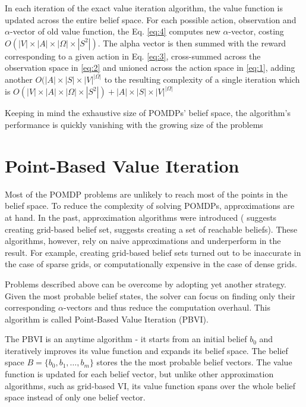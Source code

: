 In each iteration of the exact value iteration algorithm, the value function is updated across the entire belief space. For each possible action, observation and $\alpha$-vector of old value function, the Eq. \ref{eq:4} computes new $\alpha$-vector, costing $O(|V| \times |A| \times |\Omega| \times |S^2|)$. The alpha vector is then summed with the reward corresponding to a given action in Eq. \ref{eq:3}, cross-summed across the observation space in \ref{eq:2} and unioned across the action space in \ref{eq:1}, adding another $O(|A| \times |S| \times |V|^{|\Omega|}$ to the resulting complexity of a single iteration which is $O(|V| \times |A| \times |\Omega| \times |S^2|) + |A| \times |S| \times |V|^{|\Omega|}$ 

 Keeping in mind the exhaustive size of POMDPs' belief space, the algorithm's performance is quickly vanishing with the growing size of the problems


\section{Point-Based Value Iteration}

Most of the POMDP problems are unlikely to reach most of the points in the belief space. To reduce the complexity of solving POMDPs, approximations are at hand. In the past, approximation algorithms were introduced (\cite{10.2307/171496} suggests creating grid-based belief set, \cite{Hauskrecht00} suggests creating a set of reachable beliefs). These algorithms, however, rely on naive approximations and underperform in the result. For example, creating grid-based belief sets turned out to be inaccurate in the case of sparse grids, or computationally expensive in the case of dense grids.

Problems described above can be overcome by adopting yet another strategy. Given the most probable belief states, the solver can focus on finding only their corresponding $\alpha$-vectors and thus reduce the computation overhaul. This algorithm is called Point-Based Value Iteration (PBVI).

The PBVI \cite{pbvi} is an anytime algorithm - it starts from an initial belief $b_0$ and iteratively improves its value function and expands its belief space. The belief space $B = \{b_0, b_1, \ldots, b_m\}$ stores the the most probable belief vectors. The value function is updated for each belief vector, but unlike other approximation algorithms, such as grid-based VI, its value function spans over the whole belief space instead of only one belief vector.

